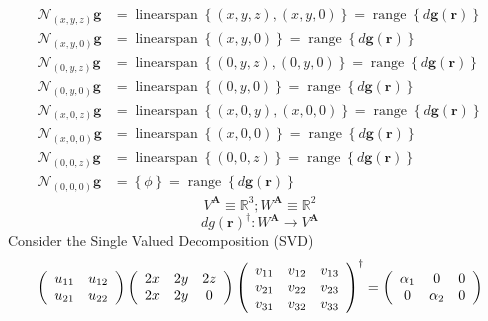 \documentclass[aps,preprint]{revtex4}%
\begin{document}
\begin{align*}
\mathcal{N}_{\left(  x,y,z\right)  }\boldsymbol{g}  &
=\operatorname*{linearspan}\left\{  \left(  x,y,z\right)  ,\left(
x,y,0\right)  \right\}  =\operatorname*{range}\left\{  d\boldsymbol{g}\left(
\boldsymbol{r}\right)  \right\} \\
\mathcal{N}_{\left(  x,y,0\right)  }\boldsymbol{g}  &
=\operatorname*{linearspan}\left\{  \left(  x,y,0\right)  \right\}
=\operatorname*{range}\left\{  d\boldsymbol{g}\left(  \boldsymbol{r}\right)
\right\} \\
\mathcal{N}_{\left(  0,y,z\right)  }\boldsymbol{g}  &
=\operatorname*{linearspan}\left\{  \left(  0,y,z\right)  ,\left(
0,y,0\right)  \right\}  =\operatorname*{range}\left\{  d\boldsymbol{g}\left(
\boldsymbol{r}\right)  \right\} \\
\mathcal{N}_{\left(  0,y,0\right)  }\boldsymbol{g}  &
=\operatorname*{linearspan}\left\{  \left(  0,y,0\right)  \right\}
=\operatorname*{range}\left\{  d\boldsymbol{g}\left(  \boldsymbol{r}\right)
\right\} \\
\mathcal{N}_{\left(  x,0,z\right)  }\boldsymbol{g}  &
=\operatorname*{linearspan}\left\{  \left(  x,0,y\right)  ,\left(
x,0,0\right)  \right\}  =\operatorname*{range}\left\{  d\boldsymbol{g}\left(
\boldsymbol{r}\right)  \right\} \\
\mathcal{N}_{\left(  x,0,0\right)  }\boldsymbol{g}  &
=\operatorname*{linearspan}\left\{  \left(  x,0,0\right)  \right\}
=\operatorname*{range}\left\{  d\boldsymbol{g}\left(  \boldsymbol{r}\right)
\right\} \\
\mathcal{N}_{\left(  0,0,z\right)  }\boldsymbol{g}  &
=\operatorname*{linearspan}\left\{  \left(  0,0,z\right)  \right\}
=\operatorname*{range}\left\{  d\boldsymbol{g}\left(  \boldsymbol{r}\right)
\right\} \\
\mathcal{N}_{\left(  0,0,0\right)  }\boldsymbol{g}  &  =\left\{  \phi\right\}
=\operatorname*{range}\left\{  d\boldsymbol{g}\left(  \boldsymbol{r}\right)
\right\}
\end{align*}%
\[
V^{\boldsymbol{A}}\equiv\mathbb{R}^{3};W^{\boldsymbol{A}}\equiv\mathbb{R}^{2}%
\]%
\[
dg\left(  \boldsymbol{r}\right)  ^{\dagger}:W^{\boldsymbol{A}}\rightarrow
V^{\boldsymbol{A}}%
\]
Consider the Single Valued Decomposition (SVD)
\begin{equation}
\left(
\begin{array}
[c]{cc}%
u_{11} & u_{12}\\
u_{21} & u_{22}%
\end{array}
\right)  \left(
\begin{array}
[c]{ccc}%
2x & 2y & 2z\\
2x & 2y & 0
\end{array}
\right)  \left(
\begin{array}
[c]{ccc}%
v_{11} & v_{12} & v_{13}\\
v_{21} & v_{22} & v_{23}\\
v_{31} & v_{32} & v_{33}%
\end{array}
\right)  ^{\dagger}=\left(
\begin{array}
[c]{ccc}%
\alpha_{1} & 0 & 0\\
0 & \alpha_{2} & 0
\end{array}
\right)
\end{equation}%
\end{document}
